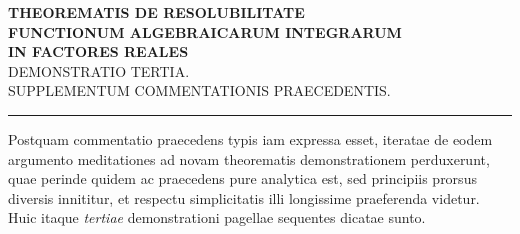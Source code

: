 \begin{center}
\textbf{THEOREMATIS DE RESOLUBILITATE}\\[8pt]
\textbf{FUNCTIONUM ALGEBRAICARUM INTEGRARUM}\\[8pt]
\textbf{IN FACTORES REALES}\\[8pt]
DEMONSTRATIO TERTIA.\\[8pt]
SUPPLEMENTUM COMMENTATIONIS PRAECEDENTIS.\\[12pt]
\rule{3cm}{0.3pt}
\end{center}
Postquam commentatio praecedens typis iam expressa esset, iteratae de eodem argumento meditationes ad novam theorematis demonstrationem perduxerunt,
quae perinde quidem ac praecedens pure analytica est, sed principiis prorsus diversis innititur, et respectu simplicitatis illi longissime praeferenda videtur. Huic
itaque \textit{tertiae} demonstrationi pagellae sequentes dicatae sunto.

